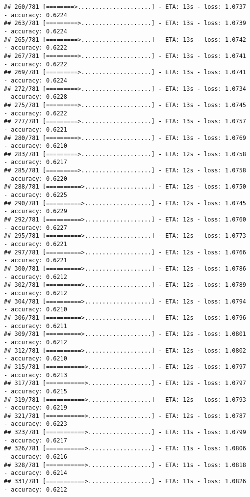 \documentclass[
]{article}
\begin{document}
\begin{verbatim}
## 260/781 [========>.....................] - ETA: 13s - loss: 1.0737 - accuracy: 0.6224
## 263/781 [=========>....................] - ETA: 13s - loss: 1.0739 - accuracy: 0.6224
## 265/781 [=========>....................] - ETA: 13s - loss: 1.0742 - accuracy: 0.6222
## 267/781 [=========>....................] - ETA: 13s - loss: 1.0741 - accuracy: 0.6222
## 269/781 [=========>....................] - ETA: 13s - loss: 1.0741 - accuracy: 0.6224
## 272/781 [=========>....................] - ETA: 13s - loss: 1.0734 - accuracy: 0.6228
## 275/781 [=========>....................] - ETA: 13s - loss: 1.0745 - accuracy: 0.6222
## 277/781 [=========>....................] - ETA: 13s - loss: 1.0757 - accuracy: 0.6221
## 280/781 [=========>....................] - ETA: 13s - loss: 1.0769 - accuracy: 0.6210
## 283/781 [=========>....................] - ETA: 12s - loss: 1.0758 - accuracy: 0.6217
## 285/781 [=========>....................] - ETA: 12s - loss: 1.0758 - accuracy: 0.6220
## 288/781 [==========>...................] - ETA: 12s - loss: 1.0750 - accuracy: 0.6225
## 290/781 [==========>...................] - ETA: 12s - loss: 1.0745 - accuracy: 0.6229
## 292/781 [==========>...................] - ETA: 12s - loss: 1.0760 - accuracy: 0.6227
## 295/781 [==========>...................] - ETA: 12s - loss: 1.0773 - accuracy: 0.6221
## 297/781 [==========>...................] - ETA: 12s - loss: 1.0766 - accuracy: 0.6221
## 300/781 [==========>...................] - ETA: 12s - loss: 1.0786 - accuracy: 0.6212
## 302/781 [==========>...................] - ETA: 12s - loss: 1.0789 - accuracy: 0.6212
## 304/781 [==========>...................] - ETA: 12s - loss: 1.0794 - accuracy: 0.6210
## 306/781 [==========>...................] - ETA: 12s - loss: 1.0796 - accuracy: 0.6211
## 309/781 [==========>...................] - ETA: 12s - loss: 1.0801 - accuracy: 0.6212
## 312/781 [==========>...................] - ETA: 12s - loss: 1.0802 - accuracy: 0.6210
## 315/781 [===========>..................] - ETA: 12s - loss: 1.0797 - accuracy: 0.6213
## 317/781 [===========>..................] - ETA: 12s - loss: 1.0797 - accuracy: 0.6215
## 319/781 [===========>..................] - ETA: 12s - loss: 1.0793 - accuracy: 0.6219
## 321/781 [===========>..................] - ETA: 12s - loss: 1.0787 - accuracy: 0.6223
## 323/781 [===========>..................] - ETA: 11s - loss: 1.0799 - accuracy: 0.6217
## 326/781 [===========>..................] - ETA: 11s - loss: 1.0806 - accuracy: 0.6216
## 328/781 [===========>..................] - ETA: 11s - loss: 1.0818 - accuracy: 0.6214
## 331/781 [===========>..................] - ETA: 11s - loss: 1.0826 - accuracy: 0.6212

\end{verbatim}
\end{document}
